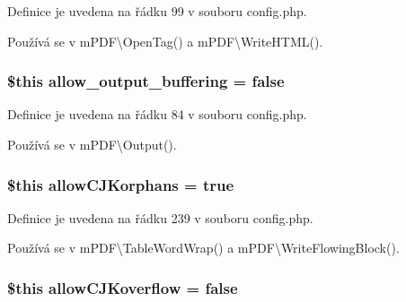 Definice je uvedena na řádku 99 v souboru config.\-php.



Používá se v m\-P\-D\-F\textbackslash{}\-Open\-Tag() a m\-P\-D\-F\textbackslash{}\-Write\-H\-T\-M\-L().

\hypertarget{config_8php_a06a3a32a809fb752defc67c71c2e3f3d}{
\subsubsection[{allow\-\_\-output\-\_\-buffering}]{\setlength{\rightskip}{0pt plus 5cm}\$this allow\-\_\-output\-\_\-buffering = {\bf false}}}\label{config_8php_a06a3a32a809fb752defc67c71c2e3f3d}


Definice je uvedena na řádku 84 v souboru config.\-php.



Používá se v m\-P\-D\-F\textbackslash{}\-Output().

\hypertarget{config_8php_ac3c778769cee991acbddda70d97d2d05}{
\subsubsection[{allow\-C\-J\-Korphans}]{\setlength{\rightskip}{0pt plus 5cm}\$this allow\-C\-J\-Korphans = true}}\label{config_8php_ac3c778769cee991acbddda70d97d2d05}


Definice je uvedena na řádku 239 v souboru config.\-php.



Používá se v m\-P\-D\-F\textbackslash{}\-Table\-Word\-Wrap() a m\-P\-D\-F\textbackslash{}\-Write\-Flowing\-Block().

\hypertarget{config_8php_a4fe056d3dd16ea78955159e107a42a63}{
\subsubsection[{allow\-C\-J\-Koverflow}]{\setlength{\rightskip}{0pt plus 5cm}\$this allow\-C\-J\-Koverflow = {\bf false}}}\label{config_8php_a4fe056d3dd16ea78955159e107a42a63}


